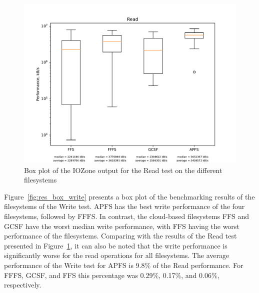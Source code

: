 \begin{figure}[!ht]
	\label{fig:res_box_read}
	\begin{center}
		\includegraphics[width=1.0\textwidth]{figures.nosync/benchmarking/Read_box.pdf}
	\end{center}
	\caption{Box plot of the IOZone output for the Read test on the different filesystems}
\end{figure}

\FloatBarrier

Figure~\ref{fig:res_box_write} presents a box plot of the benchmarking results of the filesystems of the Write test. \gls{APFS} has the best write performance of the four filesystems, followed by \gls{FFFS}. In contrast, the cloud-based filesystems \gls{FFS} and \gls{GCSF} have the worst median write performance, with \gls{FFS} having the worst performance of the filesystems. Comparing with the results of the Read test presented in Figure~\ref{fig:res_box_read}, it can also be noted that the write performance is significantly worse for the read operations for all filesystems. The average performance of the Write test for \gls{APFS} is 9.8\% of the Read performance. For \gls{FFFS}, \gls{GCSF}, and \gls{FFS} this percentage was 0.29\%, 0.17\%, and 0.06\%, respectively.

